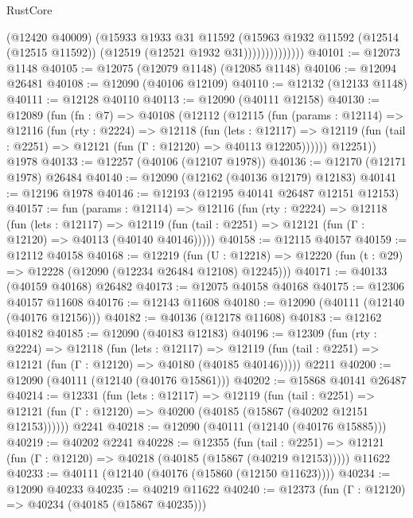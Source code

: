 \begin{lexlean}{RustCore}
\begin{coremodule}
                        (@12420 @40009)
                        (@15933
                          @1933
                          @31
                          @11592
                          (@15963
                            @1932
                            @11592
                            (@12514 (@12515 @11592))
                            (@12519 (@12521 @1932 @31))))))))))))))
@40101 := @12073 @1148
@40105 := @12075 (@12079 @1148) (@12085 @1148)
@40106 := @12094 @26481
@40108 := @12090 (@40106 @12109)
@40110 := @12132 (@12133 @1148)
@40111 := @12128 @40110
@40113 := @12090 (@40111 @12158)
@40130 := @12089
    (fun (fn : @7) =>
    @40108
      (@12112
        (@12115
          (fun (params : @12114) =>
          @12116
            (fun (rty : @2224) =>
            @12118
              (fun (lets : @12117) =>
              @12119 (fun (tail : @2251) => @12121 (fun (Γ : @12120) => @40113 @12205))))))
        @12251))
    @1978
@40133 := @12257 (@40106 (@12107 @1978))
@40136 := @12170 (@12171 @1978) @26484
@40140 := @12090 (@12162 (@40136 @12179) @12183)
@40141 := @12196 @1978
@40146 := @12193 (@12195 @40141 @26487 @12151 @12153)
@40157 := fun (params : @12114) =>
  @12116
    (fun (rty : @2224) =>
    @12118
      (fun (lets : @12117) =>
      @12119 (fun (tail : @2251) => @12121 (fun (Γ : @12120) => @40113 (@40140 @40146)))))
@40158 := @12115 @40157
@40159 := @12112 @40158
@40168 := @12219
    (fun (U : @12218) => @12220 (fun (t : @29) => @12228 (@12090 (@12234 @26484 @12108) @12245)))
@40171 := @40133 (@40159 @40168) @26482
@40173 := @12075 @40158 @40168
@40175 := @12306 @40157 @11608
@40176 := @12143 @11608
@40180 := @12090 (@40111 (@12140 (@40176 @12156)))
@40182 := @40136 (@12178 @11608)
@40183 := @12162 @40182
@40185 := @12090 (@40183 @12183)
@40196 := @12309
    (fun (rty : @2224) =>
    @12118
      (fun (lets : @12117) =>
      @12119 (fun (tail : @2251) => @12121 (fun (Γ : @12120) => @40180 (@40185 @40146)))))
    @2211
@40200 := @12090 (@40111 (@12140 (@40176 @15861)))
@40202 := @15868 @40141 @26487
@40214 := @12331
    (fun (lets : @12117) =>
    @12119
      (fun (tail : @2251) =>
      @12121 (fun (Γ : @12120) => @40200 (@40185 (@15867 (@40202 @12151 @12153))))))
    @2241
@40218 := @12090 (@40111 (@12140 (@40176 @15885)))
@40219 := @40202 @2241
@40228 := @12355
    (fun (tail : @2251) => @12121 (fun (Γ : @12120) => @40218 (@40185 (@15867 (@40219 @12153)))))
    @11622
@40233 := @40111 (@12140 (@40176 (@15860 (@12150 @11623))))
@40234 := @12090 @40233
@40235 := @40219 @11622
@40240 := @12373 (fun (Γ : @12120) => @40234 (@40185 (@15867 @40235)))

\end{coremodule}
\end{lexlean}
